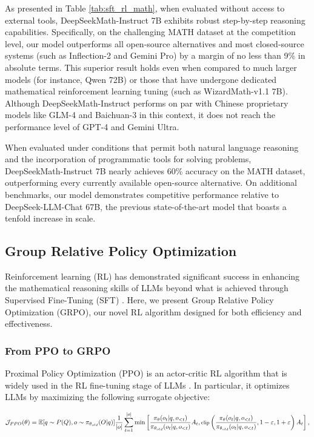 \begin{itemize}[topsep=0pt]
\begin{itemize}[topsep=0pt]
As presented in Table \ref{tab:sft_rl_math}, when evaluated without access to external tools, DeepSeekMath-Instruct 7B exhibits robust step-by-step reasoning capabilities. Specifically, on the challenging MATH dataset at the competition level, our model outperforms all open-source alternatives and most closed-source systems (such as Inflection-2 and Gemini Pro) by a margin of no less than 9\% in absolute terms. This superior result holds even when compared to much larger models (for instance, Qwen 72B) or those that have undergone dedicated mathematical reinforcement learning tuning (such as WizardMath-v1.1 7B). Although DeepSeekMath-Instruct performs on par with Chinese proprietary models like GLM-4 and Baichuan-3 in this context, it does not reach the performance level of GPT-4 and Gemini Ultra.

When evaluated under conditions that permit both natural language reasoning and the incorporation of programmatic tools for solving problems, DeepSeekMath-Instruct 7B nearly achieves 60\% accuracy on the MATH dataset, outperforming every currently available open-source alternative. On additional benchmarks, our model demonstrates competitive performance relative to DeepSeek-LLM-Chat 67B, the previous state-of-the-art model that boasts a tenfold increase in scale.

\subsection{Group Relative Policy Optimization} Reinforcement learning (RL) has demonstrated significant success in enhancing the mathematical reasoning skills of LLMs beyond what is achieved through Supervised Fine-Tuning (SFT) \citep{wang2023math,wizardmath}. Here, we present Group Relative Policy Optimization (GRPO), our novel RL algorithm designed for both efficiency and effectiveness.

\subsubsection{From PPO to GRPO} Proximal Policy Optimization (PPO) \citep{schulman2017proximal} is an actor-critic RL algorithm that is widely used in the RL fine-tuning stage of LLMs \citep{ouyang2022training}. In particular, it optimizes LLMs by maximizing the following surrogate objective:

\begin{equation}
\footnotesize
    \mathcal{J}_{PPO}(\theta) = \mathbb{E}{[q \sim P(Q), o \sim \pi_{\theta_{old}}(O|q)]} \frac{1}{|o|} \sum_{t=1}^{|o|} \min \left[ \frac{\pi_\theta(o_{t} | q, o_{<t})}{\pi_{\theta_{old}}(o_{t} | q, o_{<t})} A_{t}, \text{clip} \left( \frac{\pi_\theta(o_{t} | q, o_{<t})}{\pi_{\theta_{old}}(o_{t} | q, o_{<t})}, 1 - \varepsilon, 1 + \varepsilon \right)  A_{t} \right] ,
\end{equation}


\end{itemize}
\end{itemize}
